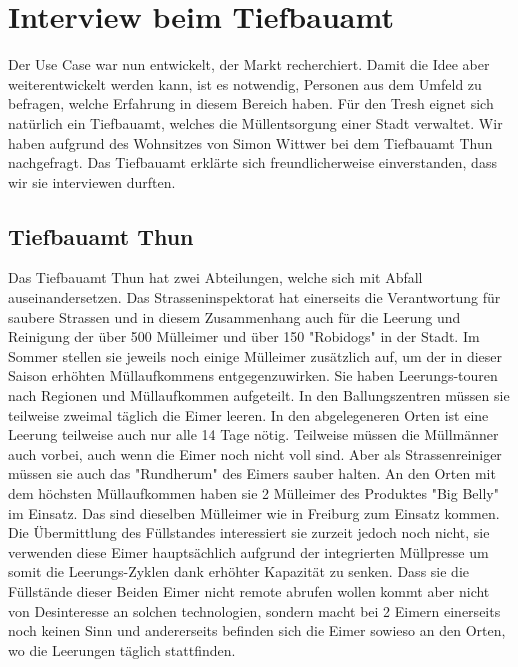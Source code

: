 \section{Interview beim Tiefbauamt}
Der Use Case war nun entwickelt, der Markt recherchiert. Damit die Idee aber weiterentwickelt werden kann, ist es notwendig, Personen aus dem Umfeld zu befragen, welche Erfahrung in diesem Bereich haben. Für den Tresh eignet sich natürlich ein Tiefbauamt, welches die Müllentsorgung einer Stadt verwaltet. Wir haben aufgrund des Wohnsitzes von Simon Wittwer bei dem Tiefbauamt Thun nachgefragt. Das Tiefbauamt erklärte sich freundlicherweise einverstanden, dass wir sie interviewen durften. 
\subsection{Tiefbauamt Thun}
Das Tiefbauamt Thun hat zwei Abteilungen, welche sich mit Abfall auseinandersetzen. Das Strasseninspektorat hat einerseits die Verantwortung für saubere Strassen und in diesem Zusammenhang auch für die Leerung und Reinigung der über 500 Mülleimer und über 150 "Robidogs" in der Stadt. Im Sommer stellen sie jeweils noch einige Mülleimer zusätzlich auf, um der in dieser Saison erhöhten Müllaufkommens entgegenzuwirken. Sie haben Leerungs-touren nach Regionen und Müllaufkommen aufgeteilt. In den Ballungszentren müssen sie teilweise zweimal täglich die Eimer leeren. In den abgelegeneren Orten ist eine Leerung teilweise auch nur alle 14 Tage nötig. Teilweise müssen die Müllmänner auch vorbei, auch wenn die Eimer noch nicht voll sind. Aber als Strassenreiniger müssen sie auch das "Rundherum" des Eimers sauber halten. An den Orten mit dem höchsten Müllaufkommen haben sie 2 Mülleimer des Produktes "Big Belly" im Einsatz. Das sind dieselben Mülleimer wie in Freiburg zum Einsatz kommen. Die Übermittlung des Füllstandes interessiert sie zurzeit jedoch noch nicht, sie verwenden diese Eimer hauptsächlich aufgrund der integrierten Müllpresse um somit die Leerungs-Zyklen dank erhöhter Kapazität zu senken. Dass sie die Füllstände dieser Beiden Eimer nicht remote abrufen wollen kommt aber nicht von Desinteresse an solchen technologien, sondern macht bei 2 Eimern einerseits noch keinen Sinn und andererseits befinden sich die Eimer sowieso an den Orten, wo die Leerungen täglich stattfinden.

